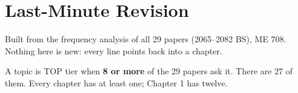 \cleardoublepage
\section{Last-Minute Revision}

{\color{sub}\footnotesize Built from the frequency analysis of all 29 papers (2065--2082 BS),
ME 708. Nothing here is new: every line points back into a chapter.}

\hr


{\color{sub}\footnotesize A topic is TOP tier when \textbf{8 or more} of the 29 papers ask it.
There are 27 of them. Every chapter has at least one; Chapter 1 has twelve.}

